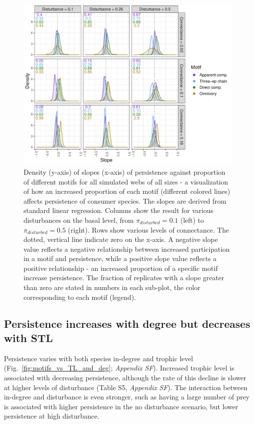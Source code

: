 \documentclass[12pt]{article}
\begin{document}
\begin{spacing}{2.0}
        \begin{figure}[h!]
            \centering
            \includegraphics[width=\textwidth]{figures/prop_dens_bp_vs_C_allS.pdf}
            \caption{Density (y-axis) of slopes (x-axis) of persistence against proportion of different motifs for all simulated webs of all sizes - a visualization of how an increased proportion of each motif (different colored lines) affects persistence of consumer species. The slopes are derived from standard linear regression. Columns show the result for various disturbances on the basal level, from $\pi_{disturbed} = 0.1$ (left) to $\pi_{disturbed} = 0.5$ (right). Rows show various levels of connectance. The dotted, vertical line indicate zero on the x-axis. A negative slope value reflects a negative relationship between increased participation in a motif and persistence, while a positive slope value reflects a positive relationship - an increased proportion of a specific motif increase persistence. The fraction of replicates with a slope greater than zero are stated in numbers in each sub-plot, the color corresponding to each motif (legend). }
            \label{fig:density_prop_C}
        \end{figure}    
    
    \subsection*{Persistence increases with degree but decreases with STL}
    
        Persistence varies with both species in-degree and trophic level (Fig.~\ref{fig:motifs_vs_TL_and_deg}; \emph{Appendix SF}). Increased trophic level is associated with decreasing persistence, although the rate of this decline is slower at higher levels of disturbance (Table S5, \emph{Appendix SF}).
        The interaction between in-degree and disturbance is even stronger, such as having a large number of prey is associated with higher persistence in the no disturbance scenario, but lower persistence at high disturbance.
        


\end{spacing}
\end{document}

